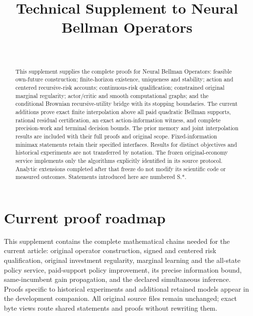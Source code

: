 \documentclass[ecta,nameyear,draft]{econsocart}
\begin{document}
\begin{frontmatter}
\title{Technical Supplement to Neural Bellman Operators}
\begin{aug}
\author[id=au1,addressref={add1}]{~}
\address[id=add1]{Peking University}
\end{aug}
\begin{abstract}
This supplement supplies the complete proofs for Neural Bellman Operators:
feasible own-future construction; finite-horizon existence, uniqueness and
stability; action and centered recursive-risk accounts; continuous-risk
qualification; constrained original marginal regularity; actor/critic and
smooth computational graphs; and the conditional Brownian recursive-utility
bridge with its stopping boundaries. The current additions prove exact finite
interpolation above all paid quadratic Bellman supports, rational residual
certification, an exact action-information witness, and complete precision-work
and terminal decision bounds. The prior memory and joint interpolation results
are included with their full proofs and original scope. Fixed-information
minimax statements retain their specified interfaces. Results for distinct
objectives and historical experiments are not transferred by notation.
The frozen original-economy service implements only the algorithms explicitly
identified in its source protocol. Analytic extensions completed after that
freeze do not modify its scientific code or measured outcomes.
Statements introduced here are numbered S.*.
\end{abstract}
\end{frontmatter}
\section{Current proof roadmap}
This supplement contains the complete mathematical chains needed for the
current article: original operator construction, signed and centered risk
qualification, original investment regularity, marginal learning and the
all-state policy service, paid-support policy improvement, its precise
information bound, same-incumbent gain propagation, and the declared simultaneous inference. Proofs specific
to historical experiments and additional retained models appear in the
development companion. All original source files remain unchanged; exact
byte views route shared statements and proofs without rewriting them.




\end{document}
